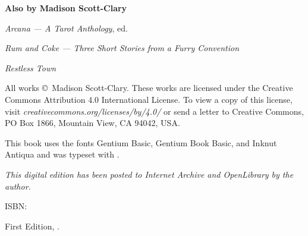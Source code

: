
\thispagestyle{empty}
\null
\vfill
\begin{center}
    \noindent\textbf{\DisplayFont Also by Madison Scott-Clary}

    \emph{Arcana --- A Tarot Anthology}, ed.

    \emph{Rum and Coke --- Three Short Stories from a Furry Convention}

    \emph{Restless Town}
\end{center}
\vfill
\singlespacing
{\small\parindent0pt\parskip5pt
\noindent All works \copyright\ Madison Scott-Clary. These works are licensed under the Creative Commons Attribution 4.0 International License. To view a copy of this license, visit \mbox{\emph{creativecommons.org/licenses/by/4.0/}} or send a letter to Creative Commons, PO Box 1866, Mountain View, CA 94042, USA.

This book uses the fonts Gentium Basic, {\AltFont Gentium Book Basic}, and {\TitleFont Inknut Antiqua} and was typeset with {\XeLaTeX}.

\vspace{1ex}

\textit{This digital edition has been posted to Internet Archive and OpenLibrary by the author.}

ISBN: \ISBN

\vspace{1ex}

\emph{\Title}

\vspace{1ex}

First Edition, \Year.

\EditionsList
}

\cleardoublepage
